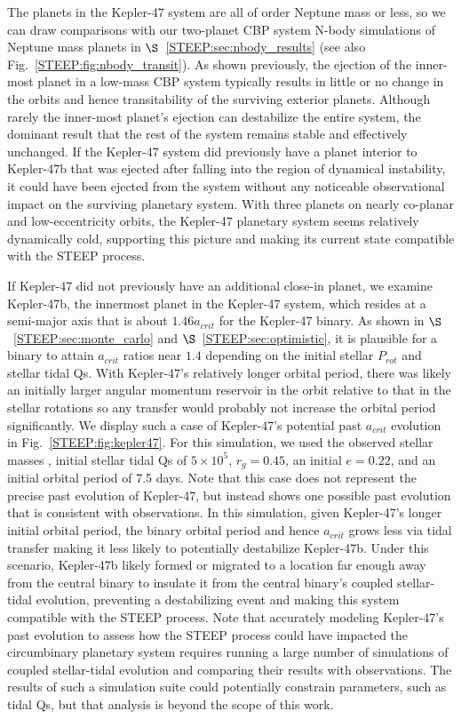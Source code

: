 The planets in the Kepler-47 system are all of order Neptune mass or less, so we can draw comparisons with our two-planet CBP system N-body simulations of Neptune mass planets in $\S$~\ref{STEEP:sec:nbody_results} (see also Fig.~\ref{STEEP:fig:nbody_transit}).  As shown previously, the ejection of the inner-most planet in a low-mass CBP system typically results in little or no change in the orbits and hence transitability of the surviving exterior planets.  Although rarely the inner-most planet's ejection can destabilize the entire system, the dominant result that the rest of the system remains stable and effectively unchanged.  If the Kepler-47 system did previously have a planet interior to Kepler-47b that was ejected after falling into the region of dynamical instability, it could have been ejected from the system without any noticeable observational impact on the surviving planetary system.  With three planets on nearly co-planar and low-eccentricity orbits, the Kepler-47 planetary system seems relatively dynamically cold, supporting this picture and making its current state compatible with the STEEP process.

If Kepler-47 did not previously have an additional close-in planet, we examine Kepler-47b, the innermost planet in the Kepler-47 system, which resides at a semi-major axis that is about $1.46 a_{crit}$ for the Kepler-47 binary.  As shown in $\S$~\ref{STEEP:sec:monte_carlo} and $\S$~\ref{STEEP:sec:optimistic}, it is plausible for a binary to attain $a_{crit}$ ratios near $1.4$ depending on the initial stellar $P_{rot}$ and stellar tidal Qs.  With Kepler-47's relatively longer orbital period, there was likely an initially larger angular momentum reservoir in the orbit relative to that in the stellar rotations so any transfer would probably not increase the orbital period significantly.  We display such a case of Kepler-47's potential past $a_{crit}$ evolution in Fig.~\ref{STEEP:fig:kepler47}.  For this simulation, we used the observed stellar masses \citep{Orosz2012}, initial stellar tidal Qs of $5 \times 10^5$, $r_g = 0.45$, an initial $e = 0.22$, and an initial orbital period of 7.5 days.  Note that this case does not represent the precise past evolution of Kepler-47, but instead shows one possible past evolution that is consistent with observations.  In this simulation, given Kepler-47's longer initial orbital period, the binary orbital period and hence $a_{crit}$ grows less via tidal transfer making it less likely to potentially destabilize Kepler-47b.  Under this scenario, Kepler-47b likely formed or migrated to a location far enough away from the central binary to insulate it from the central binary's coupled stellar-tidal evolution, preventing a destabilizing event and making this system compatible with the STEEP process.  Note that accurately modeling Kepler-47's past evolution to assess how the STEEP process could have impacted the circumbinary planetary system requires running a large number of simulations of coupled stellar-tidal evolution and comparing their results with observations.  The results of such a simulation suite could potentially constrain parameters, such as tidal Qs, but that analysis is beyond the scope of this work.

